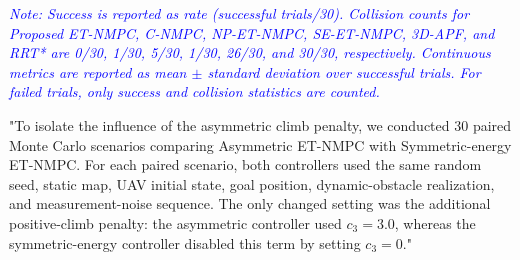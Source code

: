 \documentclass[12pt, twosides]{article}
\theoremstyle{definition}
\begin{document}
\textcolor{blue}{%
\begin{table}[h!]
\color{blue}
\centering
\captionsetup{labelformat=empty}
\caption{Table III: Quantitative Performance Comparison of Different Algorithms in a Complex Dynamic Urban Scenario}
\scriptsize
\renewcommand{\arraystretch}{1.12}
\setlength{\tabcolsep}{1.5pt}
\begin{flushleft}
\footnotesize
\textit{Note: Success is reported as rate (successful trials/30). Collision counts for Proposed ET-NMPC, C-NMPC, NP-ET-NMPC, SE-ET-NMPC, 3D-APF, and RRT* are 0/30, 1/30, 5/30, 1/30, 26/30, and 30/30, respectively. Continuous metrics are reported as mean $\pm$ standard deviation over successful trials. For failed trials, only success and collision statistics are counted.}
\end{flushleft}
\end{table}
}

"To isolate the influence of the asymmetric climb penalty, we conducted 30 paired Monte Carlo scenarios comparing Asymmetric ET-NMPC with Symmetric-energy ET-NMPC. For each paired scenario, both controllers used the same random seed, static map, UAV initial state, goal position, dynamic-obstacle realization, and measurement-noise sequence. The only changed setting was the additional positive-climb penalty: the asymmetric controller used $c_3=3.0$, whereas the symmetric-energy controller disabled this term by setting $c_3=0$."
\end{document}
